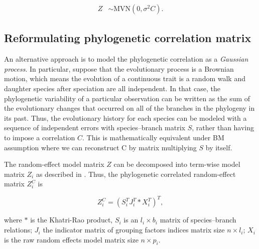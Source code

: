\begin{align}
Z & \sim \textrm{MVN}(0,\sigma^{2}C). \label{eq:glmmgls}
\end{align}

\subsection{Reformulating phylogenetic correlation matrix}

An alternative approach is to model the phylogenetic correlation as a \textit{Gaussian process}. 
In particular, suppose that the evolutionary process is a Brownian motion, which means the evolution of a continuous trait is a random walk and daughter species after speciation are all independent.  
In that case, the phylogenetic variability of a particular observation can be written as the sum of the evolutionary changes that occurred on all of the branches in the phylogeny in its past. 
Thus, the evolutionary history for each species can be modeled with a sequence of independent errors with species--branch matrix $S$, rather than having to impose a correlation $C$. 
This is mathematically equivalent under BM assumption where we can reconstruct C by matrix multiplying $S$ by itself.

The random-effect model matrix $Z$ can be decomposed into term-wise model matrix $Z_{i}$ as described in \citet{bates2015fitting}.
Thus, the phylogenetic correlated random-effect matrix $Z^{C}_{i}$ is

\begin{equation}
Z^{C}_{i} = (S^{T}_{i}J^{T}_{i} \ast X^{T}_{i})^{T}, \label{eq:ZC}
\end{equation}


where $\ast$ is the Khatri-Rao product, $S_{i}$ is an $l_{i} \times b_{i}$ matrix of species--branch relations; $J_{i}$ the indicator matrix of grouping factors indices matrix size $n \times l_{i}$; $X_{i}$ is the raw random effects model matrix size $n \times p_{i}$. 

